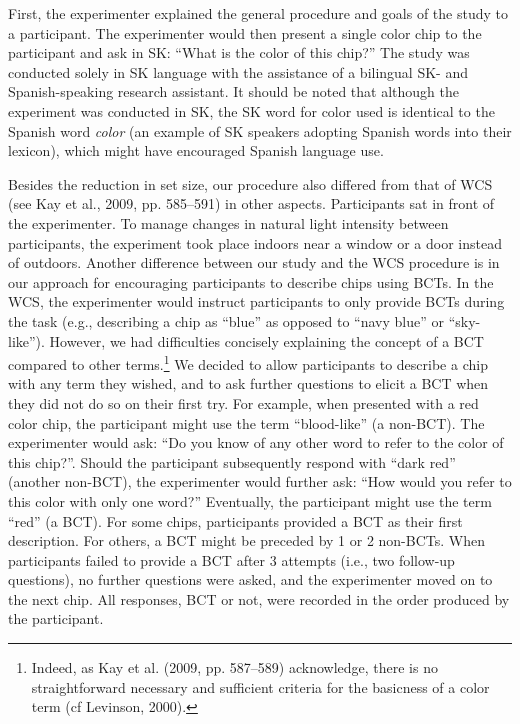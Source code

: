 \documentclass[
  english,
  ,man,floatsintext]{apa6}
\begin{document}
First, the experimenter explained the general procedure and goals of the study to a participant. The experimenter would then present a single color chip to the participant and ask in SK: \enquote{What is the color of this chip?} The study was conducted solely in SK language with the assistance of a bilingual SK- and Spanish-speaking research assistant. It should be noted that although the experiment was conducted in SK, the SK word for color used is identical to the Spanish word \emph{color} (an example of SK speakers adopting Spanish words into their lexicon), which might have encouraged Spanish language use.

Besides the reduction in set size, our procedure also differed from that of WCS (see Kay et al., 2009, pp. 585--591) in other aspects. Participants sat in front of the experimenter. To manage changes in natural light intensity between participants, the experiment took place indoors near a window or a door instead of outdoors. Another difference between our study and the WCS procedure is in our approach for encouraging participants to describe chips using BCTs. In the WCS, the experimenter would instruct participants to only provide BCTs during the task (e.g., describing a chip as \enquote{blue} as opposed to \enquote{navy blue} or \enquote{sky-like}). However, we had difficulties concisely explaining the concept of a BCT compared to other terms.\footnote{Indeed, as Kay et al. (2009, pp. 587--589) acknowledge, there is no straightforward necessary and sufficient criteria for the basicness of a color term (cf Levinson, 2000).} We decided to allow participants to describe a chip with any term they wished, and to ask further questions to elicit a BCT when they did not do so on their first try. For example, when presented with a red color chip, the participant might use the term \enquote{blood-like} (a non-BCT). The experimenter would ask: \enquote{Do you know of any other word to refer to the color of this chip?}. Should the participant subsequently respond with \enquote{dark red} (another non-BCT), the experimenter would further ask: \enquote{How would you refer to this color with only one word?} Eventually, the participant might use the term \enquote{red} (a BCT). For some chips, participants provided a BCT as their first description. For others, a BCT might be preceded by 1 or 2 non-BCTs. When participants failed to provide a BCT after 3 attempts (i.e., two follow-up questions), no further questions were asked, and the experimenter moved on to the next chip. All responses, BCT or not, were recorded in the order produced by the participant.
\end{document}
